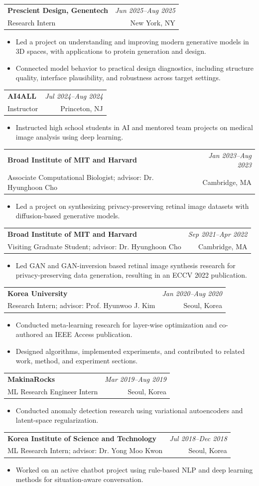\documentclass[10pt,letterpaper]{article}
\makeatletter
\newcommand{\entry}[4]{%
  \begin{tabularx}{\textwidth}{@{}>{\raggedright\arraybackslash}X r@{}}
    \textbf{#1} & \textit{#2}\\
    #3 & #4
  \end{tabularx}\vspace{2pt}
}
\newcommand{\compactitem}[1]{\begin{itemize}#1\end{itemize}\vspace{1pt}}
\makeatother
\begin{document}
\entry{Prescient Design, Genentech}{Jun 2025--Aug 2025}{Research Intern}{New York, NY}
\compactitem{
  \item Led a project on understanding and improving modern generative models in 3D spaces, with applications to protein generation and design.
  \item Connected model behavior to practical design diagnostics, including structure quality, interface plausibility, and robustness across target settings.
}

\entry{AI4ALL}{Jul 2024--Aug 2024}{Instructor}{Princeton, NJ}
\compactitem{
  \item Instructed high school students in AI and mentored team projects on medical image analysis using deep learning.
}

\entry{Broad Institute of MIT and Harvard}{Jan 2023--Aug 2023}{Associate Computational Biologist; advisor: Dr. Hyunghoon Cho}{Cambridge, MA}
\compactitem{
  \item Led a project on synthesizing privacy-preserving retinal image datasets with diffusion-based generative models.
}

\entry{Broad Institute of MIT and Harvard}{Sep 2021--Apr 2022}{Visiting Graduate Student; advisor: Dr. Hyunghoon Cho}{Cambridge, MA}
\compactitem{
  \item Led GAN and GAN-inversion based retinal image synthesis research for privacy-preserving data generation, resulting in an ECCV 2022 publication.
}

\entry{Korea University}{Jan 2020--Aug 2020}{Research Intern; advisor: Prof. Hyunwoo J. Kim}{Seoul, Korea}
\compactitem{
  \item Conducted meta-learning research for layer-wise optimization and co-authored an IEEE Access publication.
  \item Designed algorithms, implemented experiments, and contributed to related work, method, and experiment sections.
}

\entry{MakinaRocks}{Mar 2019--Aug 2019}{ML Research Engineer Intern}{Seoul, Korea}
\compactitem{
  \item Conducted anomaly detection research using variational autoencoders and latent-space regularization.
}

\entry{Korea Institute of Science and Technology}{Jul 2018--Dec 2018}{ML Research Intern; advisor: Dr. Yong Moo Kwon}{Seoul, Korea}
\compactitem{
  \item Worked on an active chatbot project using rule-based NLP and deep learning methods for situation-aware conversation.
}
\end{document}
